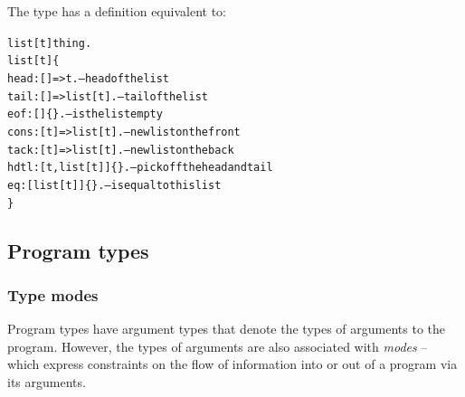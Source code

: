 The  type has a definition equivalent to:
\begin{alltt}
list[t] \impl thing.
list[t] \impl \{
    head:[]=>t.                -- head of the list
    tail:[]=>list[t].          -- tail of the list
    eof:[]\{\}.                  -- is the list empty
    cons:[t]=>list[t].         -- new list on the front
    tack:[t]=>list[t].         -- new list on the back
    hdtl:[t,list[t]]\{\}.        -- pick off the head and tail
    eq:[list[t]]\{\}.            -- is equal to this list
\}
\end{alltt}

\subsection{Program types}

\subsubsection{Type modes}

Program types have argument types that denote the types of arguments to the program. However, the types of arguments are also associated with \emph{modes} -- which express constraints on the flow of information into or out of a program via its arguments.


